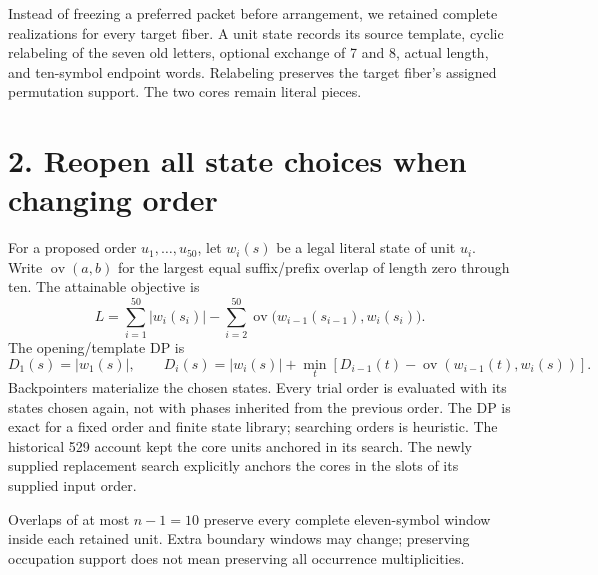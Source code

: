 \documentclass[11pt]{article}
\begin{document}
Instead of freezing a preferred packet before arrangement, we retained
complete realizations for every target fiber. A unit state records its
source template, cyclic relabeling of the seven old letters, optional
exchange of 7 and 8, actual length, and ten-symbol endpoint words.
Relabeling preserves the target fiber's assigned permutation support.
The two cores remain literal pieces.

\section*{2. Reopen all state choices when changing order}
For a proposed order $u_1,\ldots,u_{50}$, let $w_i(s)$ be a legal literal
state of unit $u_i$. Write $\operatorname{ov}(a,b)$ for the largest equal
suffix/prefix overlap of length zero through ten. The attainable objective is
\[
L=\sum_{i=1}^{50}|w_i(s_i)|-
\sum_{i=2}^{50}\operatorname{ov}\bigl(w_{i-1}(s_{i-1}),w_i(s_i)\bigr).
\]
The opening/template DP is
\[
D_1(s)=|w_1(s)|,\qquad
D_i(s)=|w_i(s)|+\min_t\left[D_{i-1}(t)-\operatorname{ov}(w_{i-1}(t),w_i(s))\right].
\]
Backpointers materialize the chosen states. Every trial order is evaluated
with its states chosen again, not with phases inherited from the previous
order. The DP is exact for a fixed order and finite state library; searching
orders is heuristic. The historical 529 account kept the core units
anchored in its search. The newly supplied replacement search explicitly
anchors the cores in the slots of its supplied input order.

Overlaps of at most $n-1=10$ preserve every complete eleven-symbol window
inside each retained unit. Extra boundary windows may change; preserving
occupation support does not mean preserving all occurrence multiplicities.
\end{document}
